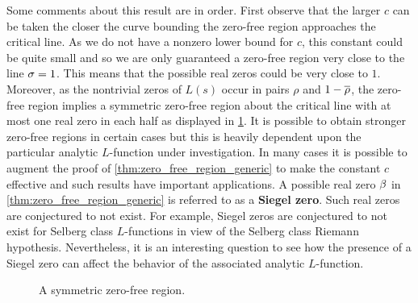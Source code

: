     Some comments about this result are in order. First observe that the larger \(c\) can be taken the closer the curve bounding the zero-free region approaches the critical line. As we do not have a nonzero lower bound for \(c\), this constant could be quite small and so we are only guaranteed a zero-free region very close to the line \(\sigma = 1\). This means that the possible real zeros could be very close to \(1\). Moreover, as the nontrivial zeros of \(L(s)\) occur in pairs \(\rho\) and \(1-\overline{\rho}\), the zero-free region implies a symmetric zero-free region about the critical line with at most one real zero in each half as displayed in \cref{fig:symmetric_zero_free_region}. It is possible to obtain stronger zero-free regions in certain cases but this is heavily dependent upon the particular analytic \(L\)-function under investigation. In many cases it is possible to augment the proof of \cref{thm:zero_free_region_generic} to make the constant \(c\) effective and such results have important applications. A possible real zero \(\beta\) in \cref{thm:zero_free_region_generic} is referred to as a \textbf{Siegel zero}. Such real zeros are conjectured to not exist. For example, Siegel zeros are conjectured to not exist for Selberg class \(L\)-functions in view of the Selberg class Riemann hypothesis. Nevertheless, it is an interesting question to see how the presence of a Siegel zero can affect the behavior of the associated analytic \(L\)-function.

    \begin{figure}[ht]
      \centering
      \caption{A symmetric zero-free region.}
      \label{fig:symmetric_zero_free_region}
    \end{figure}
